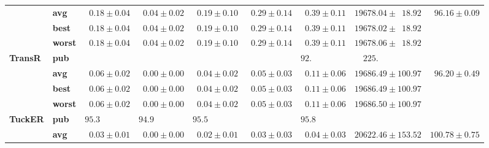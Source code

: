 \begin{tabular}{llrrrrrrr}
       & \textbf{avg} &  $\phantom{0}0.18 \pm 0.04$ &  $\phantom{0}0.04 \pm 0.02$ &  $\phantom{0}0.19 \pm 0.10$ &  $\phantom{0}0.29 \pm 0.14$ &  $\phantom{0}0.39 \pm 0.11$ &            $19678.04 \pm \phantom{0}18.92$ &  $\phantom{0}96.16 \pm 0.09$ \\
       & \textbf{best} &  $\phantom{0}0.18 \pm 0.04$ &  $\phantom{0}0.04 \pm 0.02$ &  $\phantom{0}0.19 \pm 0.10$ &  $\phantom{0}0.29 \pm 0.14$ &  $\phantom{0}0.39 \pm 0.11$ &            $19678.02 \pm \phantom{0}18.92$ &                              \\
       & \textbf{worst} &  $\phantom{0}0.18 \pm 0.04$ &  $\phantom{0}0.04 \pm 0.02$ &  $\phantom{0}0.19 \pm 0.10$ &  $\phantom{0}0.29 \pm 0.14$ &  $\phantom{0}0.39 \pm 0.11$ &            $19678.06 \pm \phantom{0}18.92$ &                              \\\midrule
\textbf{TransR} & \textbf{pub} &                             &                             &                             &                             &  $92.\phantom{00 \pm 0.00}$ &  $\phantom{00}225.\phantom{00 \pm 000.00}$ &                              \\
       & \textbf{avg} &  $\phantom{0}0.06 \pm 0.02$ &  $\phantom{0}0.00 \pm 0.00$ &  $\phantom{0}0.04 \pm 0.02$ &  $\phantom{0}0.05 \pm 0.03$ &  $\phantom{0}0.11 \pm 0.06$ &                      $19686.49 \pm 100.97$ &  $\phantom{0}96.20 \pm 0.49$ \\
       & \textbf{best} &  $\phantom{0}0.06 \pm 0.02$ &  $\phantom{0}0.00 \pm 0.00$ &  $\phantom{0}0.04 \pm 0.02$ &  $\phantom{0}0.05 \pm 0.03$ &  $\phantom{0}0.11 \pm 0.06$ &                      $19686.49 \pm 100.97$ &                              \\
       & \textbf{worst} &  $\phantom{0}0.06 \pm 0.02$ &  $\phantom{0}0.00 \pm 0.00$ &  $\phantom{0}0.04 \pm 0.02$ &  $\phantom{0}0.05 \pm 0.03$ &  $\phantom{0}0.11 \pm 0.06$ &                      $19686.50 \pm 100.97$ &                              \\\midrule
\textbf{TuckER} & \textbf{pub} &  $95.3\phantom{0 \pm 0.00}$ &  $94.9\phantom{0 \pm 0.00}$ &  $95.5\phantom{0 \pm 0.00}$ &                             &  $95.8\phantom{0 \pm 0.00}$ &                                            &                              \\
       & \textbf{avg} &  $\phantom{0}0.03 \pm 0.01$ &  $\phantom{0}0.00 \pm 0.00$ &  $\phantom{0}0.02 \pm 0.01$ &  $\phantom{0}0.03 \pm 0.03$ &  $\phantom{0}0.04 \pm 0.03$ &                      $20622.46 \pm 153.52$ &            $100.78 \pm 0.75$ \\
\bottomrule
\end{tabular}

